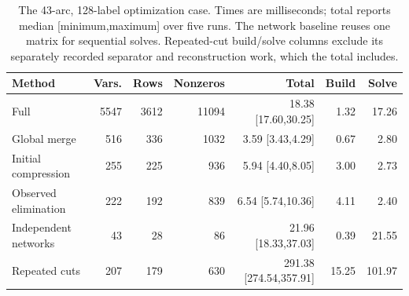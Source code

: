 \begin{table}[tb]\centering\footnotesize
\caption{The 43-arc, 128-label optimization case. Times are milliseconds; total reports median [minimum,maximum] over five runs. The network baseline reuses one matrix for sequential solves. Repeated-cut build/solve columns exclude its separately recorded separator and reconstruction work, which the total includes.}
\label{tab:computation-opt}
\setlength{\tabcolsep}{3pt}
\begin{tabular}{lrrr rrr}\toprule
Method & Vars. & Rows & Nonzeros & Total & Build & Solve\\\midrule
Full & 5547 & 3612 & 11094 & 18.38 [17.60,30.25] & 1.32 & 17.26 \\
Global merge & 516 & 336 & 1032 & 3.59 [3.43,4.29] & 0.67 & 2.80 \\
Initial compression & 255 & 225 & 936 & 5.94 [4.40,8.05] & 3.00 & 2.73 \\
Observed elimination & 222 & 192 & 839 & 6.54 [5.74,10.36] & 4.11 & 2.40 \\
Independent networks & 43 & 28 & 86 & 21.96 [18.33,37.03] & 0.39 & 21.55 \\
Repeated cuts & 207 & 179 & 630 & 291.38 [274.54,357.91] & 15.25 & 101.97 \\
\bottomrule\end{tabular}\end{table}
